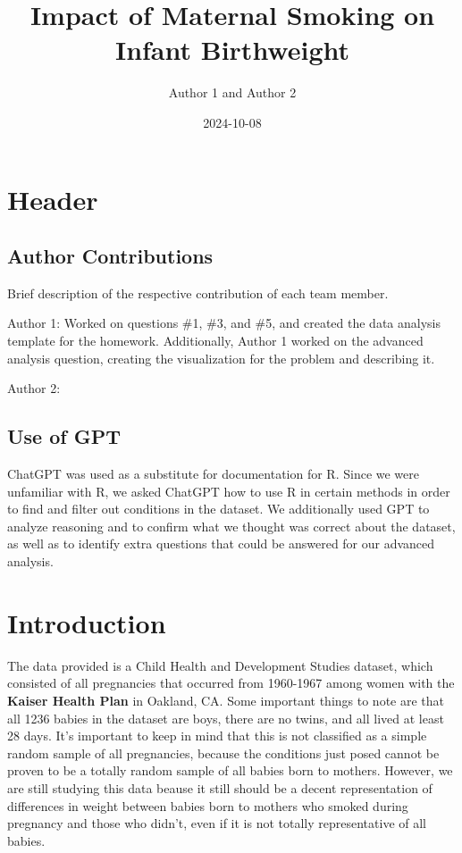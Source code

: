 \documentclass[
]{article}
\title{Impact of Maternal Smoking on Infant Birthweight}
\author{Author 1 and Author 2}
\date{2024-10-08}
\begin{document}
\maketitle

\section{Header}\label{header}

\subsection{Author Contributions}\label{author-contributions}

Brief description of the respective contribution of each team member.

Author 1: Worked on questions \#1, \#3, and \#5, and created the data
analysis template for the homework. Additionally, Author 1 worked on the
advanced analysis question, creating the visualization for the problem
and describing it.

Author 2:

\subsection{Use of GPT}\label{use-of-gpt}

ChatGPT was used as a substitute for documentation for R. Since we were
unfamiliar with R, we asked ChatGPT how to use R in certain methods in
order to find and filter out conditions in the dataset. We additionally
used GPT to analyze reasoning and to confirm what we thought was correct
about the dataset, as well as to identify extra questions that could be
answered for our advanced analysis.

\section{Introduction}\label{introduction}

The data provided is a Child Health and Development Studies dataset,
which consisted of all pregnancies that occurred from 1960-1967 among
women with the \textbf{Kaiser Health Plan} in Oakland, CA. Some
important things to note are that all 1236 babies in the dataset are
boys, there are no twins, and all lived at least 28 days. It's important
to keep in mind that this is not classified as a simple random sample of
all pregnancies, because the conditions just posed cannot be proven to
be a totally random sample of all babies born to mothers. However, we
are still studying this data beause it still should be a decent
representation of differences in weight between babies born to mothers
who smoked during pregnancy and those who didn't, even if it is not
totally representative of all babies.
\end{document}
